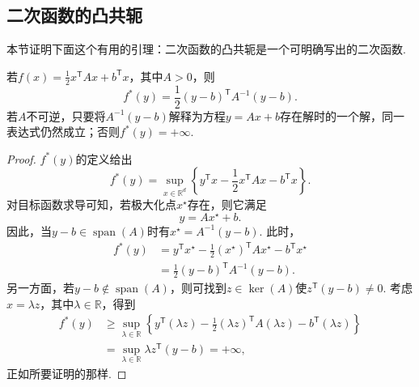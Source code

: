 \subsection{二次函数的凸共轭}\label{sec:A.3}

本节证明下面这个有用的引理：二次函数的凸共轭是一个可明确写出的二次函数.

\begin{lemma}\label{lem:A.13}
若$f(x)=\frac12x^{\mathsf T}Ax+b^{\mathsf T}x$，其中$A>0$，则
\begin{equation}\label{eq:A.3}
f^*(y)=\frac12(y-b)^{\mathsf T}A^{-1}(y-b).
\end{equation}
若$A$不可逆，只要将$A^{-1}(y-b)$解释为方程$y=Ax+b$存在解时的一个解，同一表达式仍然成立；否则$f^*(y)=+\infty$.
\end{lemma}

\begin{proof}
$f^*(y)$的定义给出
$$
f^*(y)=\sup_{x\in\mathbb R^d}\left\{y^{\mathsf T}x-\frac12x^{\mathsf T}Ax-b^{\mathsf T}x\right\}.
$$
对目标函数求导可知，若极大化点$x^\star$存在，则它满足
$$
y=Ax^\star+b.
$$
因此，当$y-b\in\operatorname{span}(A)$时有$x^\star=A^{-1}(y-b)$. 此时，
$$
\begin{aligned}
f^*(y)&=y^{\mathsf T}x^\star-\frac12(x^\star)^{\mathsf T}Ax^\star-b^{\mathsf T}x^\star\\
&=\frac12(y-b)^{\mathsf T}A^{-1}(y-b).
\end{aligned}
$$
另一方面，若$y-b\notin\operatorname{span}(A)$，则可找到$z\in\ker(A)$使$z^{\mathsf T}(y-b)\neq0$. 考虑$x=\lambda z$，其中$\lambda\in\mathbb R$，得到
$$
\begin{aligned}
f^*(y)&\geq\sup_{\lambda\in\mathbb R}\left\{y^{\mathsf T}(\lambda z)-\frac12(\lambda z)^{\mathsf T}A(\lambda z)-b^{\mathsf T}(\lambda z)\right\}\\
&=\sup_{\lambda\in\mathbb R}\lambda z^{\mathsf T}(y-b)=+\infty,
\end{aligned}
$$
正如所要证明的那样.
\end{proof}
